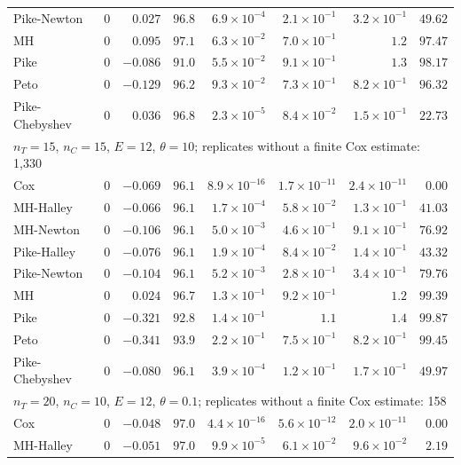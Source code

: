 \begin{landscape}
\begin{longtable}{lrrrrrrr}
Pike-Newton & 0 & $0.027$ & $96.8$ & $6.9 \times 10^{-4}$ & $2.1 \times 10^{-1}$ & $3.2 \times 10^{-1}$ & $49.62$ \\
MH & 0 & $0.095$ & $97.1$ & $6.3 \times 10^{-2}$ & $7.0 \times 10^{-1}$ & $1.2$ & $97.47$ \\
Pike & 0 & $-0.086$ & $91.0$ & $5.5 \times 10^{-2}$ & $9.1 \times 10^{-1}$ & $1.3$ & $98.17$ \\
Peto & 0 & $-0.129$ & $96.2$ & $9.3 \times 10^{-2}$ & $7.3 \times 10^{-1}$ & $8.2 \times 10^{-1}$ & $96.32$ \\
Pike-Chebyshev & 0 & $0.036$ & $96.8$ & $2.3 \times 10^{-5}$ & $8.4 \times 10^{-2}$ & $1.5 \times 10^{-1}$ & $22.73$ \\
\multicolumn{8}{l}{$n_T = 15$, $n_C = 15$, $E = 12$, $\theta = 10$; replicates without a finite Cox estimate: 1,330} \\
Cox & 0 & $-0.069$ & $96.1$ & $8.9 \times 10^{-16}$ & $1.7 \times 10^{-11}$ & $2.4 \times 10^{-11}$ & $0.00$ \\
MH-Halley & 0 & $-0.066$ & $96.1$ & $1.7 \times 10^{-4}$ & $5.8 \times 10^{-2}$ & $1.3 \times 10^{-1}$ & $41.03$ \\
MH-Newton & 0 & $-0.106$ & $96.1$ & $5.0 \times 10^{-3}$ & $4.6 \times 10^{-1}$ & $9.1 \times 10^{-1}$ & $76.92$ \\
Pike-Halley & 0 & $-0.076$ & $96.1$ & $1.9 \times 10^{-4}$ & $8.4 \times 10^{-2}$ & $1.4 \times 10^{-1}$ & $43.32$ \\
Pike-Newton & 0 & $-0.104$ & $96.1$ & $5.2 \times 10^{-3}$ & $2.8 \times 10^{-1}$ & $3.4 \times 10^{-1}$ & $79.76$ \\
MH & 0 & $0.024$ & $96.7$ & $1.3 \times 10^{-1}$ & $9.2 \times 10^{-1}$ & $1.2$ & $99.39$ \\
Pike & 0 & $-0.321$ & $92.8$ & $1.4 \times 10^{-1}$ & $1.1$ & $1.4$ & $99.87$ \\
Peto & 0 & $-0.341$ & $93.9$ & $2.2 \times 10^{-1}$ & $7.5 \times 10^{-1}$ & $8.2 \times 10^{-1}$ & $99.45$ \\
Pike-Chebyshev & 0 & $-0.080$ & $96.1$ & $3.9 \times 10^{-4}$ & $1.2 \times 10^{-1}$ & $1.7 \times 10^{-1}$ & $49.97$ \\
\multicolumn{8}{l}{$n_T = 20$, $n_C = 10$, $E = 12$, $\theta = 0.1$; replicates without a finite Cox estimate: 158} \\
Cox & 0 & $-0.048$ & $97.0$ & $4.4 \times 10^{-16}$ & $5.6 \times 10^{-12}$ & $2.0 \times 10^{-11}$ & $0.00$ \\
MH-Halley & 0 & $-0.051$ & $97.0$ & $9.9 \times 10^{-5}$ & $6.1 \times 10^{-2}$ & $9.6 \times 10^{-2}$ & $2.19$ \\

\end{longtable}
\end{landscape}
